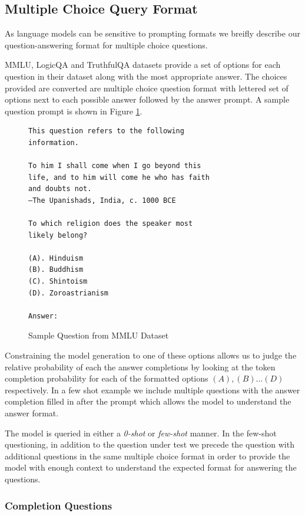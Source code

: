 \documentclass[11pt]{article}
\begin{document}
\subsection{Multiple Choice Query Format}

As language models can be sensitive to prompting formats we breifly describe our question-answering format for multiple choice questions.

MMLU, LogicQA and TruthfulQA datasets provide a set of 
options for each question in their dataset along with 
the most appropriate answer. The choices provided 
are converted are multiple choice question format 
with lettered set of options next to each possible answer followed by the answer prompt. 
A sample question prompt is shown in Figure \ref{fig:mmlu-sample-question}.

\begin{figure}
\begin{Verbatim}
This question refers to the following 
information.

To him I shall come when I go beyond this 
life, and to him will come he who has faith 
and doubts not.
—The Upanishads, India, c. 1000 BCE

To which religion does the speaker most 
likely belong?

(A). Hinduism
(B). Buddhism
(C). Shintoism
(D). Zoroastrianism

Answer:
\end{Verbatim}
\caption{Sample Question from MMLU Dataset}
\label{fig:mmlu-sample-question}
\end{figure}

Constraining the model generation to one of these options 
allows us to judge the relative probability of each the answer completions by 
looking at the token completion probability 
for each of the  formatted options $(A),(B) \dots (D)$ 
respectively. 
In a few shot example we include multiple questions 
with the answer completion filled in after the prompt which allows the model to understand the answer 
format.

The model is queried in either a \emph{0-shot} or 
\emph{few-shot} manner. In the few-shot questioning, in 
addition to the question under test we precede the question 
with additional questions in the same multiple choice format 
in order to provide the model with enough context 
to understand the expected format for answering the questions.

\iffalse
\subsubsection{Completion Questions} %
\end{document}
